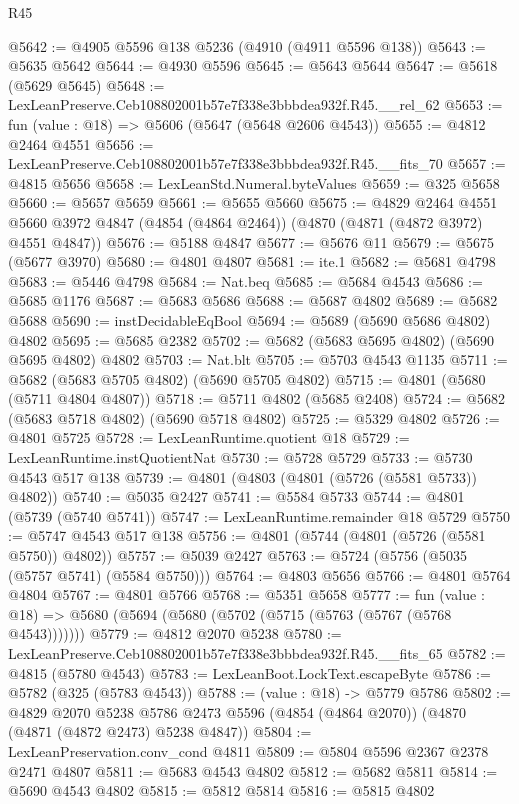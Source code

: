 \begin{lexlean}{R45}
\begin{coremodule}
@5642 := @4905 @5596 @138 @5236 (@4910 (@4911 @5596 @138))
@5643 := @5635 @5642
@5644 := @4930 @5596
@5645 := @5643 @5644
@5647 := @5618 (@5629 @5645)
@5648 := LexLeanPreserve.Ceb108802001b57e7f338e3bbbdea932f.R45.__rel_62
@5653 := fun (value : @18) => @5606 (@5647 (@5648 @2606 @4543))
@5655 := @4812 @2464 @4551
@5656 := LexLeanPreserve.Ceb108802001b57e7f338e3bbbdea932f.R45.__fits_70
@5657 := @4815 @5656
@5658 := LexLeanStd.Numeral.byteValues
@5659 := @325 @5658
@5660 := @5657 @5659
@5661 := @5655 @5660
@5675 := @4829
    @2464
    @4551
    @5660
    @3972
    @4847
    (@4854 (@4864 @2464))
    (@4870 (@4871 (@4872 @3972) @4551 @4847))
@5676 := @5188 @4847
@5677 := @5676 @11
@5679 := @5675 (@5677 @3970)
@5680 := @4801 @4807
@5681 := ite.{1}
@5682 := @5681 @4798
@5683 := @5446 @4798
@5684 := Nat.beq
@5685 := @5684 @4543
@5686 := @5685 @1176
@5687 := @5683 @5686
@5688 := @5687 @4802
@5689 := @5682 @5688
@5690 := instDecidableEqBool
@5694 := @5689 (@5690 @5686 @4802) @4802
@5695 := @5685 @2382
@5702 := @5682 (@5683 @5695 @4802) (@5690 @5695 @4802) @4802
@5703 := Nat.blt
@5705 := @5703 @4543 @1135
@5711 := @5682 (@5683 @5705 @4802) (@5690 @5705 @4802)
@5715 := @4801 (@5680 (@5711 @4804 @4807))
@5718 := @5711 @4802 (@5685 @2408)
@5724 := @5682 (@5683 @5718 @4802) (@5690 @5718 @4802)
@5725 := @5329 @4802
@5726 := @4801 @5725
@5728 := LexLeanRuntime.quotient @18
@5729 := LexLeanRuntime.instQuotientNat
@5730 := @5728 @5729
@5733 := @5730 @4543 @517 @138
@5739 := @4801 (@4803 (@4801 (@5726 (@5581 @5733)) @4802))
@5740 := @5035 @2427
@5741 := @5584 @5733
@5744 := @4801 (@5739 (@5740 @5741))
@5747 := LexLeanRuntime.remainder @18 @5729
@5750 := @5747 @4543 @517 @138
@5756 := @4801 (@5744 (@4801 (@5726 (@5581 @5750)) @4802))
@5757 := @5039 @2427
@5763 := @5724 (@5756 (@5035 (@5757 @5741) (@5584 @5750)))
@5764 := @4803 @5656
@5766 := @4801 @5764 @4804
@5767 := @4801 @5766
@5768 := @5351 @5658
@5777 := fun (value : @18) => @5680 (@5694 (@5680 (@5702 (@5715 (@5763 (@5767 (@5768 @4543)))))))
@5779 := @4812 @2070 @5238
@5780 := LexLeanPreserve.Ceb108802001b57e7f338e3bbbdea932f.R45.__fits_65
@5782 := @4815 (@5780 @4543)
@5783 := LexLeanBoot.LockText.escapeByte
@5786 := @5782 (@325 (@5783 @4543))
@5788 := (value : @18) -> @5779 @5786
@5802 := @4829
    @2070
    @5238
    @5786
    @2473
    @5596
    (@4854 (@4864 @2070))
    (@4870 (@4871 (@4872 @2473) @5238 @4847))
@5804 := LexLeanPreservation.conv_cond @4811
@5809 := @5804 @5596 @2367 @2378 @2471 @4807
@5811 := @5683 @4543 @4802
@5812 := @5682 @5811
@5814 := @5690 @4543 @4802
@5815 := @5812 @5814
@5816 := @5815 @4802

\end{coremodule}
\end{lexlean}
